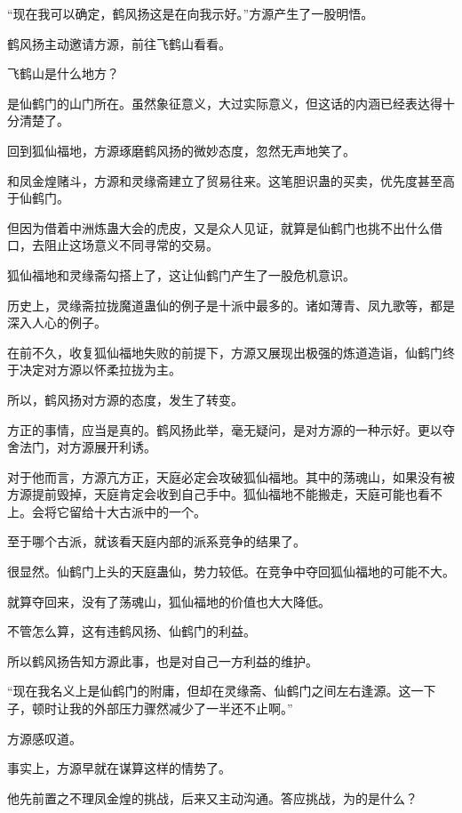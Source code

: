 
\begin{this_body}



“现在我可以确定，鹤风扬这是在向我示好。”方源产生了一股明悟。

鹤风扬主动邀请方源，前往飞鹤山看看。

飞鹤山是什么地方？

是仙鹤门的山门所在。虽然象征意义，大过实际意义，但这话的内涵已经表达得十分清楚了。

回到狐仙福地，方源琢磨鹤风扬的微妙态度，忽然无声地笑了。

和凤金煌赌斗，方源和灵缘斋建立了贸易往来。这笔胆识蛊的买卖，优先度甚至高于仙鹤门。

但因为借着中洲炼蛊大会的虎皮，又是众人见证，就算是仙鹤门也挑不出什么借口，去阻止这场意义不同寻常的交易。

狐仙福地和灵缘斋勾搭上了，这让仙鹤门产生了一股危机意识。

历史上，灵缘斋拉拢魔道蛊仙的例子是十派中最多的。诸如薄青、凤九歌等，都是深入人心的例子。

在前不久，收复狐仙福地失败的前提下，方源又展现出极强的炼道造诣，仙鹤门终于决定对方源以怀柔拉拢为主。

所以，鹤风扬对方源的态度，发生了转变。

方正的事情，应当是真的。鹤风扬此举，毫无疑问，是对方源的一种示好。更以夺舍法门，对方源展开利诱。

对于他而言，方源亢方正，天庭必定会攻破狐仙福地。其中的荡魂山，如果没有被方源提前毁掉，天庭肯定会收到自己手中。狐仙福地不能搬走，天庭可能也看不上。会将它留给十大古派中的一个。

至于哪个古派，就该看天庭内部的派系竞争的结果了。

很显然。仙鹤门上头的天庭蛊仙，势力较低。在竞争中夺回狐仙福地的可能不大。

就算夺回来，没有了荡魂山，狐仙福地的价值也大大降低。

不管怎么算，这有违鹤风扬、仙鹤门的利益。

所以鹤风扬告知方源此事，也是对自己一方利益的维护。

“现在我名义上是仙鹤门的附庸，但却在灵缘斋、仙鹤门之间左右逢源。这一下子，顿时让我的外部压力骤然减少了一半还不止啊。”

方源感叹道。

事实上，方源早就在谋算这样的情势了。

他先前置之不理凤金煌的挑战，后来又主动沟通。答应挑战，为的是什么？


\end{this_body}
